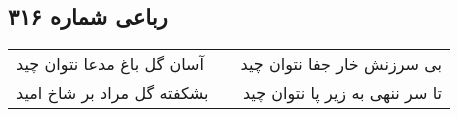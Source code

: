 \begin{center}
\section*{رباعی شماره ۳۱۶}
\label{sec:sh316}
\begin{longtable}{l p{0.5cm} r}
آسان گل باغ مدعا نتوان چید
&&
بی سرزنش خار جفا نتوان چید
\\
بشکفته گل مراد بر شاخ امید
&&
تا سر ننهی به زیر پا نتوان چید
\\
\end{longtable}
\end{center}
